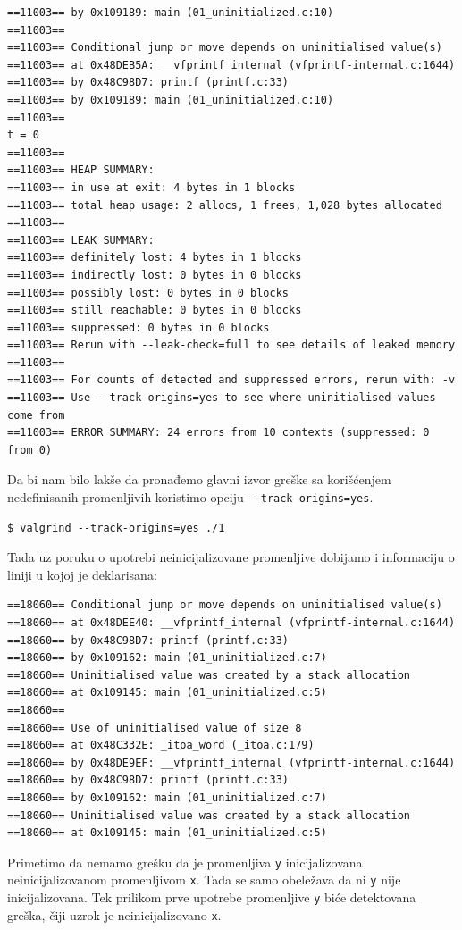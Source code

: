 \begin{verbatim}
==11003== by 0x109189: main (01_uninitialized.c:10)
==11003==
==11003== Conditional jump or move depends on uninitialised value(s)
==11003== at 0x48DEB5A: __vfprintf_internal (vfprintf-internal.c:1644)
==11003== by 0x48C98D7: printf (printf.c:33)
==11003== by 0x109189: main (01_uninitialized.c:10)
==11003==
t = 0
==11003==
==11003== HEAP SUMMARY:
==11003== in use at exit: 4 bytes in 1 blocks
==11003== total heap usage: 2 allocs, 1 frees, 1,028 bytes allocated
==11003==
==11003== LEAK SUMMARY:
==11003== definitely lost: 4 bytes in 1 blocks
==11003== indirectly lost: 0 bytes in 0 blocks
==11003== possibly lost: 0 bytes in 0 blocks
==11003== still reachable: 0 bytes in 0 blocks
==11003== suppressed: 0 bytes in 0 blocks
==11003== Rerun with --leak-check=full to see details of leaked memory
==11003==
==11003== For counts of detected and suppressed errors, rerun with: -v
==11003== Use --track-origins=yes to see where uninitialised values come from
==11003== ERROR SUMMARY: 24 errors from 10 contexts (suppressed: 0 from 0)
\end{verbatim}

Da bi nam bilo lakše da pronađemo glavni izvor greške sa korišćenjem nedefinisanih promenljivih koristimo opciju \texttt{-\/-track-origins=yes}.

\begin{verbatim}
$ valgrind --track-origins=yes ./1
\end{verbatim}

Tada uz poruku o upotrebi neinicijalizovane promenljive dobijamo i informaciju o liniji u kojoj je deklarisana:

\begin{verbatim}
==18060== Conditional jump or move depends on uninitialised value(s)
==18060== at 0x48DEE40: __vfprintf_internal (vfprintf-internal.c:1644)
==18060== by 0x48C98D7: printf (printf.c:33)
==18060== by 0x109162: main (01_uninitialized.c:7)
==18060== Uninitialised value was created by a stack allocation
==18060== at 0x109145: main (01_uninitialized.c:5)
==18060==
==18060== Use of uninitialised value of size 8
==18060== at 0x48C332E: _itoa_word (_itoa.c:179)
==18060== by 0x48DE9EF: __vfprintf_internal (vfprintf-internal.c:1644)
==18060== by 0x48C98D7: printf (printf.c:33)
==18060== by 0x109162: main (01_uninitialized.c:7)
==18060== Uninitialised value was created by a stack allocation
==18060== at 0x109145: main (01_uninitialized.c:5)
\end{verbatim}

Primetimo da nemamo grešku da je promenljiva \texttt{y} inicijalizovana neinicijalizovanom promenljivom \texttt{x}. Tada se samo obeležava da ni \texttt{y} nije inicijalizovana. Tek prilikom prve upotrebe promenljive \texttt{y} biće detektovana greška, čiji uzrok je neinicijalizovano \texttt{x}.
